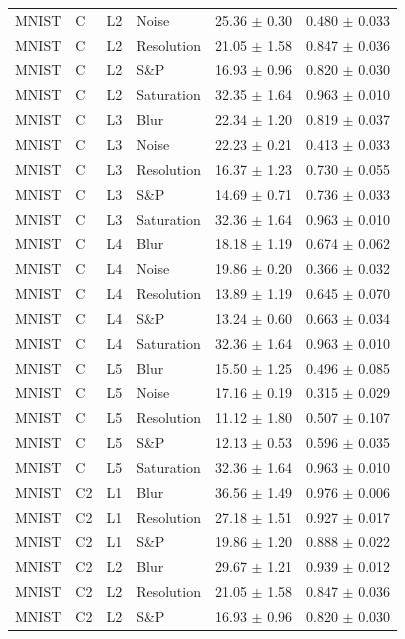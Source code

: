 \begin{table}[htbp]
\begin{tabular}{llllrr}
MNIST & C & L2 & Noise & 25.36 $\pm$ 0.30 & 0.480 $\pm$ 0.033 \\
MNIST & C & L2 & Resolution & 21.05 $\pm$ 1.58 & 0.847 $\pm$ 0.036 \\
MNIST & C & L2 & S\&P & 16.93 $\pm$ 0.96 & 0.820 $\pm$ 0.030 \\
MNIST & C & L2 & Saturation & 32.35 $\pm$ 1.64 & 0.963 $\pm$ 0.010 \\
MNIST & C & L3 & Blur & 22.34 $\pm$ 1.20 & 0.819 $\pm$ 0.037 \\
MNIST & C & L3 & Noise & 22.23 $\pm$ 0.21 & 0.413 $\pm$ 0.033 \\
MNIST & C & L3 & Resolution & 16.37 $\pm$ 1.23 & 0.730 $\pm$ 0.055 \\
MNIST & C & L3 & S\&P & 14.69 $\pm$ 0.71 & 0.736 $\pm$ 0.033 \\
MNIST & C & L3 & Saturation & 32.36 $\pm$ 1.64 & 0.963 $\pm$ 0.010 \\
MNIST & C & L4 & Blur & 18.18 $\pm$ 1.19 & 0.674 $\pm$ 0.062 \\
MNIST & C & L4 & Noise & 19.86 $\pm$ 0.20 & 0.366 $\pm$ 0.032 \\
MNIST & C & L4 & Resolution & 13.89 $\pm$ 1.19 & 0.645 $\pm$ 0.070 \\
MNIST & C & L4 & S\&P & 13.24 $\pm$ 0.60 & 0.663 $\pm$ 0.034 \\
MNIST & C & L4 & Saturation & 32.36 $\pm$ 1.64 & 0.963 $\pm$ 0.010 \\
MNIST & C & L5 & Blur & 15.50 $\pm$ 1.25 & 0.496 $\pm$ 0.085 \\
MNIST & C & L5 & Noise & 17.16 $\pm$ 0.19 & 0.315 $\pm$ 0.029 \\
MNIST & C & L5 & Resolution & 11.12 $\pm$ 1.80 & 0.507 $\pm$ 0.107 \\
MNIST & C & L5 & S\&P & 12.13 $\pm$ 0.53 & 0.596 $\pm$ 0.035 \\
MNIST & C & L5 & Saturation & 32.36 $\pm$ 1.64 & 0.963 $\pm$ 0.010 \\
MNIST & C2 & L1 & Blur & 36.56 $\pm$ 1.49 & 0.976 $\pm$ 0.006 \\
MNIST & C2 & L1 & Resolution & 27.18 $\pm$ 1.51 & 0.927 $\pm$ 0.017 \\
MNIST & C2 & L1 & S\&P & 19.86 $\pm$ 1.20 & 0.888 $\pm$ 0.022 \\
MNIST & C2 & L2 & Blur & 29.67 $\pm$ 1.21 & 0.939 $\pm$ 0.012 \\
MNIST & C2 & L2 & Resolution & 21.05 $\pm$ 1.58 & 0.847 $\pm$ 0.036 \\
MNIST & C2 & L2 & S\&P & 16.93 $\pm$ 0.96 & 0.820 $\pm$ 0.030 \\

\end{tabular}
\end{table}
